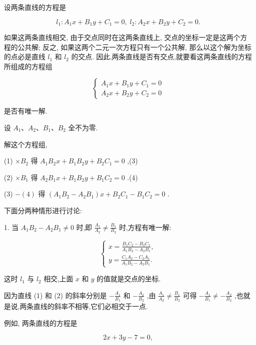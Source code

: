 \documentclass[lang=cn,newtx,10.5pt,scheme=chinese]{elegantbook}
\begin{document}
设两条直线的方程是

\[
    {l}_{1} : {A}_{1}x + {B}_{1}y + {C}_{1} = 0,\;{l}_{2} : {A}_{2}x + {B}_{2}y + {C}_{2} = 0.
\]

如果这两条直线相交, 由于交点同时在这两条直线上, 交点的坐标一定是这两个方程的公共解; 反之, 如果这两个二元一次方程只有一个公共解, 那么以这个解为坐标的点必是直线 \({l}_{1}\) 和 \({l}_{2}\) 的交点. 因此,两条直线是否有交点,就要看这两条直线的方程所组成的方程组

\[
  \left\{ \begin{array}{l} {A}_{1}x + {B}_{1}y + {C}_{1} = 0 \\ {A}_{2}x + {B}_{2}y + {C}_{2} = 0 \end{array}\right. \tag{1 2}
\]

是否有唯一解.

设 \({A}_{1}\text{、}{A}_{2}\text{、}{B}_{1}\text{、}{B}_{2}\) 全不为零.

解这个方程组,

(1) \(\times {B}_{2}\) 得 \({A}_{1}{B}_{2}x + {B}_{1}{B}_{2}y + {B}_{2}{C}_{1} = 0\) ,(3)

(2) \(\times {B}_{1}\) 得 \({A}_{2}{B}_{1}x + {B}_{1}{B}_{2}y + {B}_{1}{C}_{2} = 0\) .(4)

(3) \(- \left( 4\right)\) 得 \(\left( {{A}_{1}{B}_{2} - {A}_{2}{B}_{1}}\right) x + {B}_{2}{C}_{1} - {B}_{1}{C}_{2} = 0\) .

下面分两种情形进行讨论:

1. 当 \({A}_{1}{B}_{2} - {A}_{2}{B}_{1} \neq 0\) 时,即 \(\frac{{A}_{1}}{{A}_{2}} \neq \frac{{B}_{1}}{{B}_{2}}\) 时,方程有唯一解:

\[
  \left\{ \begin{array}{l} x = \frac{{B}_{1}{C}_{2} - {B}_{2}{C}_{1}}{{A}_{1}{B}_{2} - {A}_{2}{B}_{1}}, \\ y = \frac{{C}_{1}{A}_{2} - {C}_{2}{A}_{1}}{{A}_{1}{B}_{2} - {A}_{2}{B}_{1}}. \end{array}\right.
\]

这时 \({l}_{1}\) 与 \({l}_{2}\) 相交,上面 \(x\) 和 \(y\) 的值就是交点的坐标.

因为直线 (1) 和 (2) 的斜率分别是 \(- \frac{{A}_{1}}{{B}_{1}}\) 和 \(- \frac{{A}_{2}}{{B}_{2}}\) ,由 \(\frac{{A}_{1}}{{A}_{2}} \neq \frac{{B}_{1}}{{B}_{2}}\) 可得 \(- \frac{{A}_{1}}{{B}_{1}} \neq - \frac{{A}_{2}}{{B}_{2}}\) ,也就是说,两条直线的斜率不相等,它们必相交于一点.

例如, 两条直线的方程是

\[
    {2x} + {3y} - 7 = 0,
\]
\end{document}
